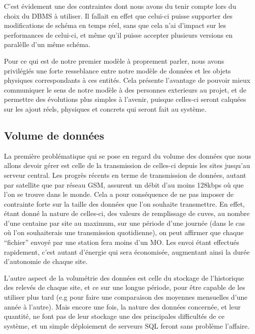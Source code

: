 C'est évidement une des contraintes dont nous avons du tenir compte lors du choix du DBMS à utiliser. Il fallait en effet que celui-ci puisse supporter des modifications de schéma en temps réel, sans que cela n'ai d'impact sur les performances de celui-ci, et même qu'il puisse accepter plusieurs versions en paralèlle d'un même schéma.

Pour ce qui est de notre premier modèle à proprement parler, nous avons privilégiés une forte resseblance entre notre modèle de données et les objets physiques correspondants à ces entités. Cela présente l'avantage de pouvoir mieux communiquer le sens de notre modèle à des personnes exterieurs au projet, et de permettre des évolutions plus simples à l'avenir, puisque celles-ci seront calquées sur les ajout réels, physiques et concrets qui seront fait au système.

\subsection{Volume de données}

La première problématique qui se pose en regard du volume des données que nous allons devoir gérer est celle de la transmission de celles-ci depuis les sites jusqu'au serveur central. Les progrès récents en terme de transmission de données, autant par satellite que par réseau GSM, assurent un débit d'au moins 128kbps où que l'on se trouve dans le monde. Cela a pour conséquence de ne pas imposer de contrainte forte sur la taille des données que l'on souhaite transmettre. En effet, étant donné la nature de celles-ci, des valeurs de remplissage de cuves, au nombre d'une centaine par site au maximum, sur une période d'une journée (dans le cas où l'on souhaiterais une transmission quotidienne), on peut affirmer que chaque ``fichier'' envoyé par une station fera moins d'un MO. Les envoi étant effectués rapidement, c'est autant d'énergie qui sera économisée, augmentant ainsi la durée d'autonomie de chaque site.

L'autre aspect de la volumétrie des données est celle du stockage de l'historique des relevés de chaque site, et ce sur une longue période, pour être capable de les utiliser plus tard (e.g pour faire une comparaison des moyennes mensuelles d'une année à l'autre). Mais encore une fois, la nature des données concernée, et leur quantité, ne font pas de leur stockage une des principales difficultés de ce système, et un simple déploiement de serveurs SQL feront sans problème l'affaire.

